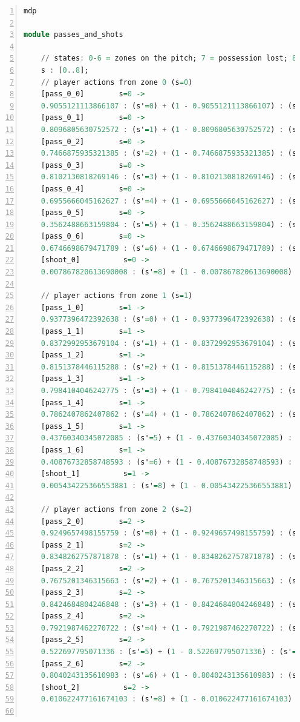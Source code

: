 \documentclass{l4proj}
\begin{document}
\begin{appendices}
\begin{lstlisting}[language=Haskell, numbers=left, caption=Initial MDP specification in the PRISM modelling language.] 
mdp

module passes_and_shots

	// states: 0-6 = zones on the pitch; 7 = possession lost; 8 = goal scored
	s : [0..8];
	// player actions from zone 0 (s=0)
	[pass_0_0]	      s=0 ->
	0.9055121113866107 : (s'=0) + (1 - 0.9055121113866107) : (s'=7);
	[pass_0_1]	      s=0 ->
	0.8096805630752572 : (s'=1) + (1 - 0.8096805630752572) : (s'=7);
	[pass_0_2]	      s=0 ->
	0.7466875935321385 : (s'=2) + (1 - 0.7466875935321385) : (s'=7);
	[pass_0_3]	      s=0 ->
	0.8102130818269146 : (s'=3) + (1 - 0.8102130818269146) : (s'=7);
	[pass_0_4]	      s=0 ->
	0.6955666045162627 : (s'=4) + (1 - 0.6955666045162627) : (s'=7);
	[pass_0_5]	      s=0 ->
	0.3562488663159804 : (s'=5) + (1 - 0.3562488663159804) : (s'=7);
	[pass_0_6]	      s=0 ->
	0.6746698679471789 : (s'=6) + (1 - 0.6746698679471789) : (s'=7);
	[shoot_0]	       s=0 ->
	0.007867820613690008 : (s'=8) + (1 - 0.007867820613690008) : (s'=7);

	// player actions from zone 1 (s=1)
	[pass_1_0]	      s=1 ->
	0.9377396472392638 : (s'=0) + (1 - 0.9377396472392638) : (s'=7);
	[pass_1_1]	      s=1 ->
	0.8372992953679104 : (s'=1) + (1 - 0.8372992953679104) : (s'=7);
	[pass_1_2]	      s=1 ->
	0.8151378446115288 : (s'=2) + (1 - 0.8151378446115288) : (s'=7);
	[pass_1_3]	      s=1 ->
	0.7984104046242775 : (s'=3) + (1 - 0.7984104046242775) : (s'=7);
	[pass_1_4]	      s=1 ->
	0.7862407862407862 : (s'=4) + (1 - 0.7862407862407862) : (s'=7);
	[pass_1_5]	      s=1 ->
	0.43760340345072085 : (s'=5) + (1 - 0.43760340345072085) : (s'=7);
	[pass_1_6]	      s=1 ->
	0.40876732858748593 : (s'=6) + (1 - 0.40876732858748593) : (s'=7);
	[shoot_1]	       s=1 ->
	0.005434225366553881 : (s'=8) + (1 - 0.005434225366553881) : (s'=7);

	// player actions from zone 2 (s=2)
	[pass_2_0]	      s=2 ->
	0.9249657498155759 : (s'=0) + (1 - 0.9249657498155759) : (s'=7);
	[pass_2_1]	      s=2 ->
	0.8348262757871878 : (s'=1) + (1 - 0.8348262757871878) : (s'=7);
	[pass_2_2]	      s=2 ->
	0.7675201346315663 : (s'=2) + (1 - 0.7675201346315663) : (s'=7);
	[pass_2_3]	      s=2 ->
	0.8424684804246848 : (s'=3) + (1 - 0.8424684804246848) : (s'=7);
	[pass_2_4]	      s=2 ->
	0.7921987462270722 : (s'=4) + (1 - 0.7921987462270722) : (s'=7);
	[pass_2_5]	      s=2 ->
	0.522697795071336 : (s'=5) + (1 - 0.522697795071336) : (s'=7);
	[pass_2_6]	      s=2 ->
	0.8040243135610983 : (s'=6) + (1 - 0.8040243135610983) : (s'=7);
	[shoot_2]	       s=2 ->
	0.010622477161674103 : (s'=8) + (1 - 0.010622477161674103) : (s'=7);


\end{lstlisting}
\end{appendices}
\end{document}
